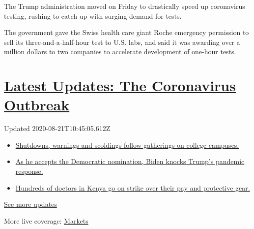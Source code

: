 The Trump administration moved on Friday to drastically speed up
coronavirus testing, rushing to catch up with surging demand for tests.

The government gave the Swiss health care giant Roche emergency
permission to sell its three-and-a-half-hour test to U.S. labs, and said
it was awarding over a million dollars to two companies to accelerate
development of one-hour tests.

\hypertarget{latest-updates-the-coronavirus-outbreak}{%
\section{\texorpdfstring{\href{https://www.nytimes3xbfgragh.onion/2020/08/21/world/covid-19-coronavirus.html?action=click\&pgtype=Article\&state=default\&region=MAIN_CONTENT_1\&context=storylines_live_updates}{Latest
Updates: The Coronavirus
Outbreak}}{Latest Updates: The Coronavirus Outbreak}}\label{latest-updates-the-coronavirus-outbreak}}

Updated 2020-08-21T10:45:05.612Z

\begin{itemize}
\tightlist
\item
  \href{https://www.nytimes3xbfgragh.onion/2020/08/21/world/covid-19-coronavirus.html?action=click\&pgtype=Article\&state=default\&region=MAIN_CONTENT_1\&context=storylines_live_updates\#link-4690b6aa}{Shutdowns,
  warnings and scoldings follow gatherings on college campuses.}
\item
  \href{https://www.nytimes3xbfgragh.onion/2020/08/21/world/covid-19-coronavirus.html?action=click\&pgtype=Article\&state=default\&region=MAIN_CONTENT_1\&context=storylines_live_updates\#link-324af071}{As
  he accepts the Democratic nomination, Biden knocks Trump's pandemic
  response.}
\item
  \href{https://www.nytimes3xbfgragh.onion/2020/08/21/world/covid-19-coronavirus.html?action=click\&pgtype=Article\&state=default\&region=MAIN_CONTENT_1\&context=storylines_live_updates\#link-35890b73}{Hundreds
  of doctors in Kenya go on strike over their pay and protective gear.}
\end{itemize}

\href{https://www.nytimes3xbfgragh.onion/2020/08/21/world/covid-19-coronavirus.html?action=click\&pgtype=Article\&state=default\&region=MAIN_CONTENT_1\&context=storylines_live_updates}{See
more updates}

More live coverage:
\href{https://www.nytimes3xbfgragh.onion/live/2020/08/20/business/stock-market-today-coronavirus?action=click\&pgtype=Article\&state=default\&region=MAIN_CONTENT_1\&context=storylines_live_updates}{Markets}

